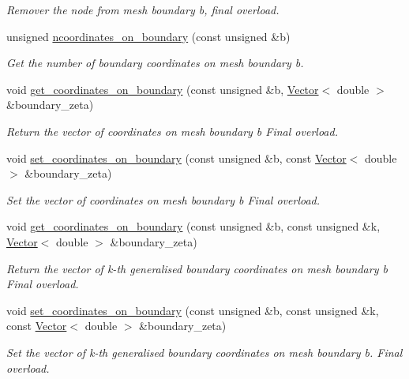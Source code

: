 \begin{DoxyCompactItemize}
\begin{DoxyCompactList}\small\item\em Remover the node from mesh boundary b, final overload. \end{DoxyCompactList}\item 
unsigned \hyperlink{classoomph_1_1BoundaryNode_a1fdf098d397c0b677566f353efae23a7}{ncoordinates\+\_\+on\+\_\+boundary} (const unsigned \&b)
\begin{DoxyCompactList}\small\item\em Get the number of boundary coordinates on mesh boundary b. \end{DoxyCompactList}\item 
void \hyperlink{classoomph_1_1BoundaryNode_ac532d47cb38f559cae6f4ed9bdd248cd}{get\+\_\+coordinates\+\_\+on\+\_\+boundary} (const unsigned \&b, \hyperlink{classoomph_1_1Vector}{Vector}$<$ double $>$ \&boundary\+\_\+zeta)
\begin{DoxyCompactList}\small\item\em Return the vector of coordinates on mesh boundary b Final overload. \end{DoxyCompactList}\item 
void \hyperlink{classoomph_1_1BoundaryNode_a3478a8db5e0bb06a7091e53c467f31db}{set\+\_\+coordinates\+\_\+on\+\_\+boundary} (const unsigned \&b, const \hyperlink{classoomph_1_1Vector}{Vector}$<$ double $>$ \&boundary\+\_\+zeta)
\begin{DoxyCompactList}\small\item\em Set the vector of coordinates on mesh boundary b Final overload. \end{DoxyCompactList}\item 
void \hyperlink{classoomph_1_1BoundaryNode_af333382e63fa01ba1a22d9964cfe92c0}{get\+\_\+coordinates\+\_\+on\+\_\+boundary} (const unsigned \&b, const unsigned \&k, \hyperlink{classoomph_1_1Vector}{Vector}$<$ double $>$ \&boundary\+\_\+zeta)
\begin{DoxyCompactList}\small\item\em Return the vector of k-\/th generalised boundary coordinates on mesh boundary b Final overload. \end{DoxyCompactList}\item 
void \hyperlink{classoomph_1_1BoundaryNode_ae47b80084ac968d1a7db32917749c56f}{set\+\_\+coordinates\+\_\+on\+\_\+boundary} (const unsigned \&b, const unsigned \&k, const \hyperlink{classoomph_1_1Vector}{Vector}$<$ double $>$ \&boundary\+\_\+zeta)
\begin{DoxyCompactList}\small\item\em Set the vector of k-\/th generalised boundary coordinates on mesh boundary b. Final overload. \end{DoxyCompactList}\item 

\end{DoxyCompactItemize}
